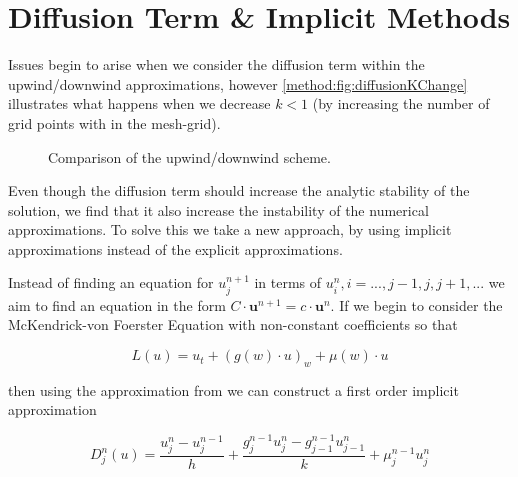 \documentclass[../main.tex]{subfiles}
\begin{document}
  \section{Diffusion Term \& Implicit Methods}
  Issues begin to arise when we consider the diffusion term within the upwind/downwind approximations, however \autoref{method:fig:diffusionKChange} illustrates what happens when we decrease $k < 1$ (by increasing the number of grid points with in the mesh-grid).

  \begin{figure}[htb]
    \centering
    \caption{\label{method:fig:diffusionKChange} Comparison of the upwind/downwind scheme.}
  \end{figure}

  Even though the diffusion term should increase the analytic stability of the solution, we find that it also increase the instability of the numerical approximations. To solve this we take a new approach, by using implicit approximations instead of the explicit approximations.

  Instead of finding an equation for $u^{n+1}_j$ in terms of $u^n_i, i = ..., j-1, j, j+1, ... $ we aim to find an equation in the form $C \cdot \textbf{u}^{n+1} = c \cdot \textbf{u}^n$. If we begin to consider the McKendrick-von Foerster Equation with non-constant coefficients so that

  \begin{equation}
    L(u) = u_t + (g(w) \cdot u)_w + \mu(w) \cdot u
  \end{equation}

  then using the approximation from \cite{hartvig2011} we can construct a first order implicit approximation

  \begin{equation}
    D^n_j(u) = \frac{u^n_j - u^{n-1}_j}{h} + \frac{g^{n-1}_j u^n_j - g^{n-1}_{j-1} u^n_{j-1}}{k} + \mu^{n-1}_j u^n_j
  \end{equation}
\end{document}
